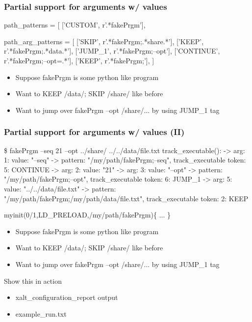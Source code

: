 \documentclass{beamer}
\begin{document}
\begin{frame}[fragile]
    \frametitle{Partial support for arguments w/ values}
 {\tiny
    \begin{semiverbatim}
path_patterns = [
    ['CUSTOM', r'.*\/fakePrgm'],

path_arg_patterns = [
  ['SKIP',     r'.*\/fakePrgm;.*\/share\/.*'],
  ['KEEP',     r'.*\/fakePrgm;.*\/data\/.*'],
  ['JUMP_1',   r'.*\/fakePrgm;--opt'],
  ['CONTINUE', r'.*\/fakePrgm;--opt=.*'],
  ['KEEP',     r'.*\/fakePrgm;'],
]
    \end{semiverbatim}
}
  \begin{itemize}
    \item Suppose fakePrgm is some python like program
    \item Want to KEEP /data/; SKIP /share/ like before
    \item Want to jump over fakePrgm --opt /share/... by using JUMP\_1 tag
  \end{itemize}
\end{frame}

\begin{frame}[fragile]
    \frametitle{Partial support for arguments w/ values (II)}
 {\tiny
    \begin{semiverbatim}
\$ fakePrgm --seq 21 --opt ../share/ ../../data/file.txt
    track_executable():
    -> arg: 1: value: "--seq"
    -> pattern: "/my/path/fakePrgm;--seq", track_executable token: 5: CONTINUE
    -> arg: 2: value: "21"
    -> arg: 3: value: "--opt"
    -> pattern: "/my/path/fakePrgm;--opt", track_executable token: 6: JUMP_1
    -> arg: 5: value: "../../data/file.txt"
    -> pattern: "/my/path/fakePrgm;/my/path/data/file.txt", track_executable token: 2: KEEP

myinit(0/1,LD_PRELOAD,/my/path/fakePrgm)\{
 ...
\}
    \end{semiverbatim}
}
  \begin{itemize}
    \item Suppose fakePrgm is some python like program
    \item Want to KEEP /data/; SKIP /share/ like before
    \item Want to jump over fakePrgm --opt /share/... by using JUMP\_1 tag
  \end{itemize}
\end{frame}

\begin{frame}{Show this in action}
  \begin{itemize}
    \item xalt\_configuration\_report output
    \item example\_run.txt
  \end{itemize}
\end{frame}
\end{document}
